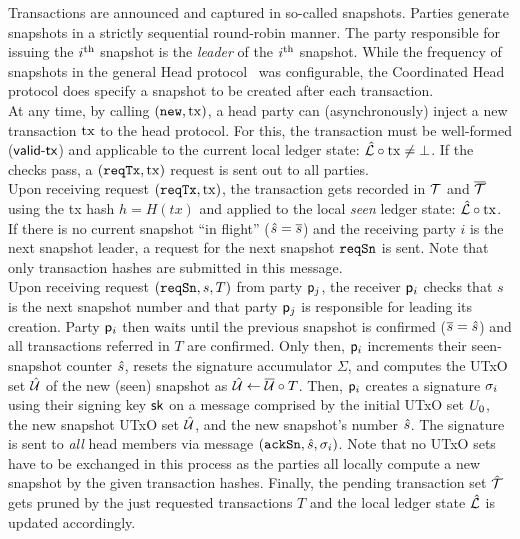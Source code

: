 Transactions are announced and captured in so-called snapshots. Parties generate
snapshots in a strictly sequential round-robin manner. The party responsible for
issuing the $i^{\text{th}}$ snapshot is the \emph{leader} of the $i^{\text{th}}$ snapshot.
While the frequency of snapshots in the general Head protocol~\cite{hydrahead20}
was configurable, the Coordinated Head protocol does specify a snapshot to be
created after each transaction.\\

\quad At any time, by calling $(\mathtt{new},\mathrm{tx})$, a head
party can (asynchronously) inject a new transaction $\mathrm{tx}$ to the head protocol.
For this, the transaction must be well-formed ($\mathsf{valid\textsf{-}{}tx}$) and applicable to the
current local ledger state: $\hat {\mathcal L} \circ \mathrm{tx} \neq \bot$. If the checks
pass, a $(\mathtt{reqTx},\mathrm{tx})$ request is sent out to all parties.\\

\quad Upon receiving request $(\mathtt{reqTx},\mathrm{tx})$, the transaction
gets recorded in ${\mathcal T}$ and $\overline {\mathcal T}$ using the tx hash $h = H(tx)$ and applied
to the local \emph{seen} ledger state: $\hat {\mathcal L} \circ \mathrm{tx}$. If there is no
current snapshot ``in flight'' ($\hat s = \overline s$) and the receiving party $i$ is
the next snapshot leader, a request for the next snapshot $\mathtt{reqSn}$ is sent. Note that only transaction hashes are submitted in this message.\\

\quad Upon receiving request $(\mathtt{reqSn},s,T)$ from party
$\mathsf p_j$, the receiver $\mathsf p_i$ checks that $s$ is the next snapshot number
and that party $\mathsf p_j$ is responsible for leading its creation. Party
$\mathsf p_i$ then waits until the previous snapshot is confirmed ($\overline s = \hat s$)
and all transactions referred in $T$  are
confirmed. Only then, $\mathsf p_i$ increments their seen-snapshot counter $\hat s$,
resets the signature accumulator $\Sigma$, and computes the UTxO set $\hat {\mathcal U}$ of
the new (seen) snapshot as $\hat {\mathcal U} \gets \overline {\mathcal U} \circ T$. Then, $\mathsf p_i$
creates a signature $\sigma_i$ using their signing key $\mathsf{sk}$ on a message
comprised by the initial UTxO set $U_{0}$, the new snapshot UTxO set $\hat {\mathcal U}$,
and the new snapshot's number $\hat s$. The signature is sent to \emph{all} head
members via message $(\mathtt{ackSn},\hat s,\sigma_i)$. Note that no UTxO sets have to be
exchanged in this process as the parties all locally compute a new snapshot by
the given transaction hashes. Finally, the pending transaction set $\hat {\mathcal T}$ gets
pruned by the just requested transactions $T$ and the local ledger state
$\hat {\mathcal L}$ is updated accordingly.\\

